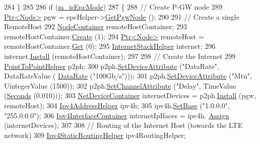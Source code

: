 \begin{DoxyCode}
284     \}
285 
286   \textcolor{keywordflow}{if} (\hyperlink{classLteCellSelectionTestCase_a6cbbe728191931290d41ef5ac4fb8b4b}{m\_isEpcMode})
287     \{
288       \textcolor{comment}{// Create P-GW node}
289       \hyperlink{classns3_1_1Ptr}{Ptr<Node>} pgw = epcHelper->\hyperlink{classns3_1_1PointToPointEpcHelper_a828ac04ae81b0e323f9ccfc08bcacf21}{GetPgwNode} ();
290 
291       \textcolor{comment}{// Create a single RemoteHost}
292       \hyperlink{classns3_1_1NodeContainer}{NodeContainer} remoteHostContainer;
293       remoteHostContainer.\hyperlink{classns3_1_1NodeContainer_a787f059e2813e8b951cc6914d11dfe69}{Create} (1);
294       \hyperlink{classns3_1_1Ptr}{Ptr<Node>} remoteHost = remoteHostContainer.\hyperlink{classns3_1_1NodeContainer_a9ed96e2ecc22e0f5a3d4842eb9bf90bf}{Get} (0);
295       \hyperlink{classns3_1_1InternetStackHelper}{InternetStackHelper} internet;
296       internet.\hyperlink{classns3_1_1InternetStackHelper_a6645b412f31283d2d9bc3d8a95cebbc0}{Install} (remoteHostContainer);
297 
298       \textcolor{comment}{// Create the Internet}
299       \hyperlink{classns3_1_1PointToPointHelper}{PointToPointHelper} p2ph;
300       p2ph.\hyperlink{classns3_1_1PointToPointHelper_a4577f5ab8c387e5528af2e0fbab1152e}{SetDeviceAttribute} (\textcolor{stringliteral}{"DataRate"}, DataRateValue (
      \hyperlink{classns3_1_1DataRate}{DataRate} (\textcolor{stringliteral}{"100Gb/s"})));
301       p2ph.\hyperlink{classns3_1_1PointToPointHelper_a4577f5ab8c387e5528af2e0fbab1152e}{SetDeviceAttribute} (\textcolor{stringliteral}{"Mtu"}, UintegerValue (1500));
302       p2ph.\hyperlink{classns3_1_1PointToPointHelper_a6b5317fd17fb61e5a53f8d66a90b63b9}{SetChannelAttribute} (\textcolor{stringliteral}{"Delay"}, TimeValue (\hyperlink{group__timecivil_ga33c34b816f8ff6628e33d5c8e9713b9e}{Seconds} (0.010)));
303       \hyperlink{classns3_1_1NetDeviceContainer}{NetDeviceContainer} internetDevices = p2ph.\hyperlink{classns3_1_1PointToPointHelper_ab9162fea3e88722666fed1106df1f9ec}{Install} (pgw, remoteHost);
304       \hyperlink{classns3_1_1Ipv4AddressHelper}{Ipv4AddressHelper} ipv4h;
305       ipv4h.\hyperlink{classns3_1_1Ipv4AddressHelper_acf7b16dd25bac67e00f5e25f90a9a035}{SetBase} (\textcolor{stringliteral}{"1.0.0.0"}, \textcolor{stringliteral}{"255.0.0.0"});
306       \hyperlink{classns3_1_1Ipv4InterfaceContainer}{Ipv4InterfaceContainer} internetIpIfaces = ipv4h.
      \hyperlink{classns3_1_1Ipv4AddressHelper_af8e7f4a1a7e74c00014a1eac445a27af}{Assign} (internetDevices);
307 
308       \textcolor{comment}{// Routing of the Internet Host (towards the LTE network)}
309       \hyperlink{classns3_1_1Ipv4StaticRoutingHelper}{Ipv4StaticRoutingHelper} ipv4RoutingHelper;

\end{DoxyCode}
